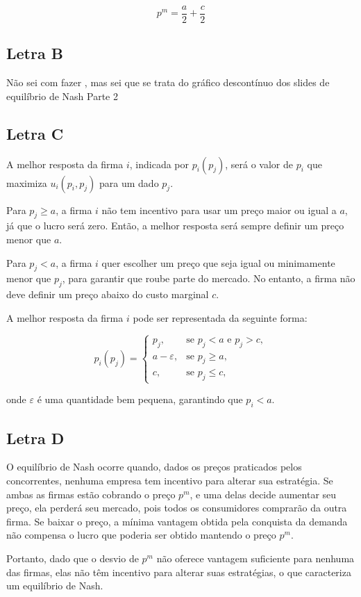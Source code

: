 \documentclass[12pt]{article}
\begin{document}
\[
p^m = \frac{a}{2} + \frac{c}{2}
\]
\subsection{\textbf{Letra B}}
Não sei com fazer , mas sei que se trata do gráfico descontínuo dos slides de equilíbrio de Nash Parte 2

\subsection{\textbf{Letra C}}
A melhor resposta da firma \( i \), indicada por \( p_i(p_j) \), será o valor de \( p_i \) que maximiza \( u_i(p_i, p_j) \) para um dado \( p_j \). 

Para \( p_j \geq a \), a firma \( i \) não tem incentivo para usar um preço maior ou igual a \( a \), já que o lucro será zero. Então, a melhor resposta será sempre definir um preço menor que \( a \). 

Para \( p_j < a \), a firma \( i \) quer escolher um preço que seja igual ou minimamente menor que \( p_j \), para garantir que roube parte do mercado. No entanto, a firma não deve definir um preço abaixo do custo marginal \( c \).

A melhor resposta da firma \( i \) pode ser representada da seguinte forma:

\[
p_i(p_j) = 
\begin{cases}
p_j, & \text{se } p_j < a \text{ e } p_j > c, \\
a - \varepsilon, & \text{se } p_j \geq a, \\
c, & \text{se } p_j \leq c,
\end{cases}
\]

onde \( \varepsilon \) é uma quantidade bem pequena, garantindo que \( p_i < a \).

\subsection{\textbf{Letra D}}
O equilíbrio de Nash ocorre quando, dados os preços praticados pelos concorrentes, nenhuma empresa tem incentivo  para alterar sua estratégia. Se ambas as firmas estão cobrando o preço \( p^m \), e uma delas decide aumentar seu preço, ela perderá seu mercado, pois todos os consumidores comprarão da outra firma. Se  baixar o preço, a mínima vantagem obtida pela conquista da demanda não compensa o lucro que poderia ser obtido mantendo o preço \( p^m \).

Portanto, dado que o desvio de \( p^m \) não oferece vantagem suficiente para nenhuma das firmas, elas não têm incentivo para alterar suas estratégias, o que caracteriza um equilíbrio de Nash.
\end{document}
